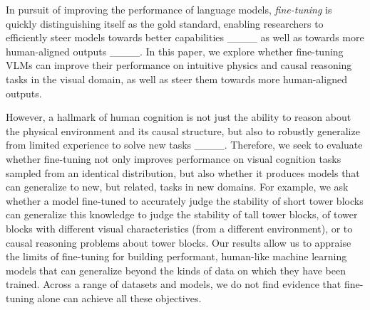 In pursuit of improving the performance of language models, \textit{fine-tuning} is quickly distinguishing itself as the gold standard, enabling researchers to efficiently steer models towards better capabilities ____ as well as towards more human-aligned outputs ____. In this paper, we explore whether fine-tuning VLMs can improve their performance on intuitive physics and causal reasoning tasks in the visual domain, as well as steer them towards more human-aligned outputs.

However, a hallmark of human cognition is not just the ability to reason about the physical environment and its causal structure, but also to robustly generalize from limited experience to solve new tasks ____. Therefore, we seek to evaluate whether fine-tuning not only improves performance on visual cognition tasks sampled from an identical distribution, but also whether it produces models that can generalize to new, but related, tasks in new domains. For example, we ask whether a model fine-tuned to accurately judge the stability of short tower blocks can generalize this knowledge to judge the stability of tall tower blocks, of tower blocks with different visual characteristics (from a different environment), or to causal reasoning problems about tower blocks. Our results allow us to appraise the limits of fine-tuning for building performant, human-like machine learning models that can generalize beyond the kinds of data on which they have been trained. Across a range of datasets and models, we do not find evidence that fine-tuning alone can achieve all these objectives.

